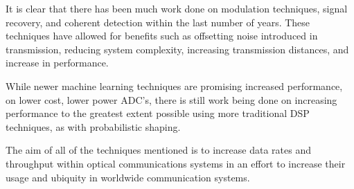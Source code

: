 It is clear that there has been much work done on modulation techniques, signal
recovery, and coherent detection within the last number of years. These
techniques have allowed for benefits such as offsetting noise introduced in
transmission, reducing system complexity, increasing transmission distances, and
increase in performance.

\par While newer machine learning techniques are promising increased
performance, on lower cost, lower power ADC's, there is still work being done on
increasing performance to the greatest extent possible using more traditional
DSP techniques, as with probabilistic shaping.

\par The aim of all of the techniques mentioned is to increase data rates and
throughput within optical communications systems in an effort to increase their
usage and ubiquity in worldwide communication systems.
